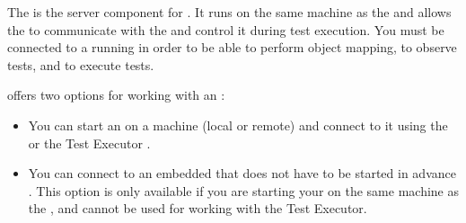 \label{Agent}

The \gdagent{} is the server component for \app{}. It runs on the same machine as the \gdaut{} and allows the \ite{} to communicate with the \gdaut{} and control it during test execution. 
You must be connected to a running \gdagent{} in order to be able to perform object mapping, to observe tests, and to execute tests. 

\app{} offers two options for working with an \gdagent{}:

\begin{itemize}
\item You can start an \gdagent{} on a machine (local or remote) and connect to it using the \ite{} or the Test Executor .
\item You can connect to an embedded \gdagent{} that does not have to be started in advance . This option is only available if you are starting your \gdaut{} on the same machine as the \ite{}, and cannot be used for working with the Test Executor.
\end{itemize}

